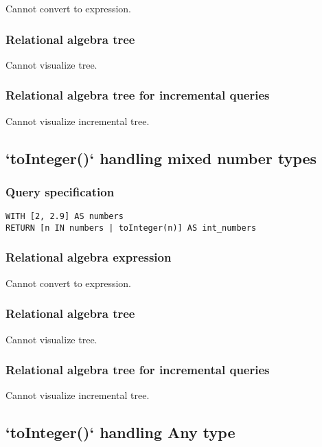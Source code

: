 Cannot convert to expression.

\subsubsection*{Relational algebra tree}

Cannot visualize tree.

\subsubsection*{Relational algebra tree for incremental queries}

Cannot visualize incremental tree.

\subsection{`toInteger()` handling mixed number types}

\subsubsection*{Query specification}

\begin{lstlisting}
WITH [2, 2.9] AS numbers
RETURN [n IN numbers | toInteger(n)] AS int_numbers
\end{lstlisting}

\subsubsection*{Relational algebra expression}

Cannot convert to expression.

\subsubsection*{Relational algebra tree}

Cannot visualize tree.

\subsubsection*{Relational algebra tree for incremental queries}

Cannot visualize incremental tree.

\subsection{`toInteger()` handling Any type}

